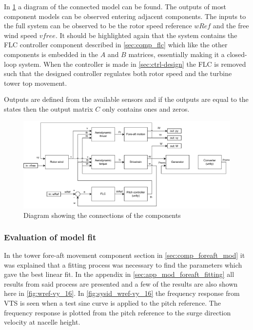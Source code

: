 In \cref{fig:connected_components} a diagram of the connected model can be found. The outputs of most component models can be observed entering adjacent components. The inputs to the full system can be observed to be the rotor speed reference $ wRef $ and the free wind speed $ vfree $. It should be highlighted again that the system contains the FLC controller component described in \cref{sec:comp_flc} which like the other components is embedded in the $ A $ and $ B $ matrices, essentially making it a closed-loop system. When the controller is made in \cref{sec:ctrl-design} the FLC is removed such that the designed controller regulates both rotor speed and the turbine tower top movement.

Outputs are defined from the available sensors and if the outputs are equal to the states then the output matrix $ C $ only contains ones and zeros.

\begin{figure}[ht]
	\centering
	\includegraphics[width=0.99\linewidth]{Graphics/wtLinComponents.pdf}
	\caption{Diagram showing the connections of the components}
	\label{fig:connected_components}
\end{figure}

\subsubsection{Evaluation of model fit} \label{sec:lin_fit_eval}
In the tower fore-aft movement component section in \cref{sec:comp_foreaft_mod} it was explained that a fitting process was necessary to find the parameters which gave the best linear fit. In the appendix in \cref{sec:app_mod_foreaft_fitting} all results from said process are presented and a few of the results are also shown here in \cref{fig:wref-vy_16}. In \cref{fig:sysid_wref-vy_16} the frequency response from VTS is seen when a test sine curve is applied to the pitch reference. The frequency response is plotted from the pitch reference to the surge direction velocity at nacelle height.

